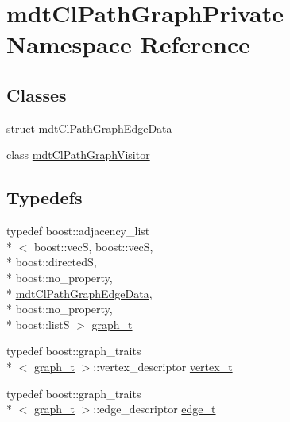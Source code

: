 \hypertarget{namespacemdt_cl_path_graph_private}{\section{mdt\-Cl\-Path\-Graph\-Private Namespace Reference}
\label{namespacemdt_cl_path_graph_private}
}
\subsection*{Classes}
\begin{DoxyCompactItemize}
\item 
struct \hyperlink{structmdt_cl_path_graph_private_1_1mdt_cl_path_graph_edge_data}{mdt\-Cl\-Path\-Graph\-Edge\-Data}
\item 
class \hyperlink{classmdt_cl_path_graph_private_1_1mdt_cl_path_graph_visitor}{mdt\-Cl\-Path\-Graph\-Visitor}
\end{DoxyCompactItemize}
\subsection*{Typedefs}
\begin{DoxyCompactItemize}
\item 
typedef boost\-::adjacency\-\_\-list\\*
$<$ boost\-::vec\-S, boost\-::vec\-S, \\*
boost\-::directed\-S, \\*
boost\-::no\-\_\-property, \\*
\hyperlink{structmdt_cl_path_graph_private_1_1mdt_cl_path_graph_edge_data}{mdt\-Cl\-Path\-Graph\-Edge\-Data}, \\*
boost\-::no\-\_\-property, \\*
boost\-::list\-S $>$ \hyperlink{namespacemdt_cl_path_graph_private_a9a28712932316ef1dd4caf737a6d7e07}{graph\-\_\-t}
\item 
typedef boost\-::graph\-\_\-traits\\*
$<$ \hyperlink{namespacemdt_cl_path_graph_private_a9a28712932316ef1dd4caf737a6d7e07}{graph\-\_\-t} $>$\-::vertex\-\_\-descriptor \hyperlink{namespacemdt_cl_path_graph_private_a0aaa28f25df9a7fcd4602cc15b3b3795}{vertex\-\_\-t}
\item 
typedef boost\-::graph\-\_\-traits\\*
$<$ \hyperlink{namespacemdt_cl_path_graph_private_a9a28712932316ef1dd4caf737a6d7e07}{graph\-\_\-t} $>$\-::edge\-\_\-descriptor \hyperlink{namespacemdt_cl_path_graph_private_a96eb891b98d89bbea2f573cd8f3accd2}{edge\-\_\-t}
\end{DoxyCompactItemize}


